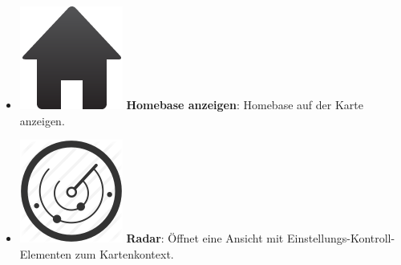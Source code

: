 \begin{itemize}[leftmargin=*,noitemsep,topsep=1ex,parsep=0pt,partopsep=0pt]
\item \includegraphics[scale=0.15]{bilder/icons/home.png} \textbf{Homebase anzeigen}: Homebase auf der Karte anzeigen.
\item \includegraphics[scale=0.15]{bilder/icons/radar.png} \textbf{Radar}: Öffnet eine Ansicht mit Einstellungs-Kontroll-Elementen zum Kartenkontext.
\end{itemize}


